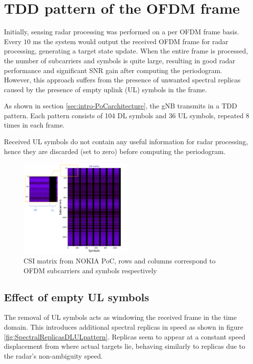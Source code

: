 \chapter{TDD pattern of the OFDM frame}
\label{chap:TDD pattern of the OFDM frame}


Initially, sensing radar processing was performed on a per OFDM frame basis. \protect\newline Every $10$ ms the system would output the received OFDM frame for radar processing, generating a target state update. When the entire frame is processed, the number of subcarriers and symbols is quite large, resulting in good radar performance and significant SNR gain after computing the periodogram. However, this approach suffers from the presence of unwanted spectral replicas caused by the presence of empty uplink (UL) symbols in the frame.
    
As shown in section \ref{sec:intro-PoCarchitecture}, the gNB transmits in a TDD pattern. Each pattern consists of 104 DL symbols and 36 UL symbols, repeated 8 times in each frame.

Received UL symbols do not contain any useful information for radar processing, hence they are discarded (set to zero) before computing the periodogram.

\begin{figure}[H]
    \centering
    \includegraphics[width=0.5\textwidth]{Images/TDDprocessing/CSIMatrix_DLULpattern.png}
    \caption{CSI matrix from NOKIA PoC, rows and columns correspond to OFDM subcarriers and symbols respectively}
    \label{fig:CSIMatrix_DLULpattern}
\end{figure}


\section{Effect of empty UL symbols}

The removal of UL symbols acts as windowing the received frame in the time domain. This introduces additional spectral replicas in speed as shown in figure \ref{fig:SpectralReplicasDLULpattern}. Replicas seem to appear at a constant speed displacement from where actual targets lie, behaving similarly to replicas due to the radar's non-ambiguity speed.

